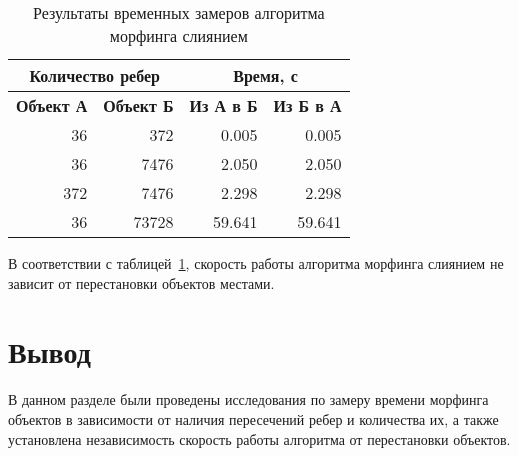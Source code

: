 \begin{table}[h!]
	\small
	\caption{Результаты временных замеров алгоритма морфинга слиянием}
	\label{tbl:res2}
	\begin{center}
		\begin{tabular}{|rr|rr|}
			\hline
			\multicolumn{2}{|c|}{\textbf{Количество ребер}}             & \multicolumn{2}{c|}{\textbf{Время, с}}                              \\ \hline
			\multicolumn{1}{|r|}{\textbf{Объект А}} & \textbf{Объект Б} & \multicolumn{1}{r|}{\textbf{Из А в Б}} & \textbf{Из Б в А}          \\ \hline
			\multicolumn{1}{|r|}{36}                & 372               & \multicolumn{1}{r|}{0.005}             & \multicolumn{1}{r|}{0.005} \\ \hline
			\multicolumn{1}{|r|}{36}                & 7476              & \multicolumn{1}{r|}{2.050}             & \multicolumn{1}{r|}{2.050} \\ \hline
			\multicolumn{1}{|r|}{372}               & 7476              & \multicolumn{1}{r|}{2.298}                  & \multicolumn{1}{r|}{2.298}                  \\ \hline
			\multicolumn{1}{|r|}{36}                & 73728             & \multicolumn{1}{r|}{59.641}                  &         59.641                   \\ \hline
		\end{tabular}
	\end{center}
\end{table}

В соответствии с таблицей~\ref{tbl:res2}, скорость работы алгоритма морфинга слиянием не зависит от перестановки объектов местами.

\section*{Вывод}

В данном разделе были проведены исследования по замеру времени морфинга объектов в зависимости от наличия пересечений ребер и количества их, а также установлена независимость скорость работы алгоритма от перестановки объектов.
